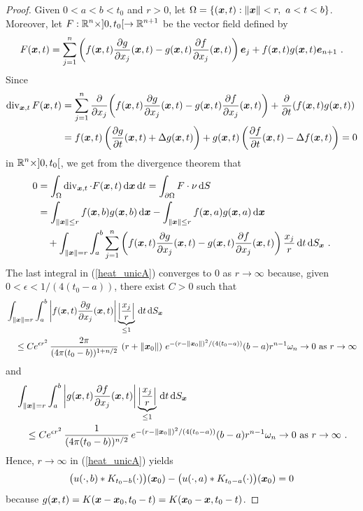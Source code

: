 \begin{proof}
Given $0< a < b < t_0$ and $r>0$, let
$\DS \Omega =
\left\{ (\VEC{x},t) : \|\VEC{x}\| < r, \ a<t<b \right\}$.
Moreover, let $\DS F:\RR^n \times ]0,t_0[ \to \RR^{n+1}$ be
the vector field defined by
\[
F(\VEC{x},t) = \sum_{j=1}^n
\left( f(\VEC{x},t) \pdydx{g}{x_j}(\VEC{x},t) - g(\VEC{x},t)
\pdydx{f}{x_j}(\VEC{x},t) \right) \VEC{e}_j
+ f(\VEC{x},t)g(\VEC{x},t) \VEC{e}_{n+1} \ .
\]
Since
\begin{align*}
\diV_{\VEC{x},t} F(\VEC{x},t)
&= \sum_{j=1}^n \pdfdx{
\left( f(\VEC{x},t) \pdydx{g}{x_j}(\VEC{x},t) - g(\VEC{x},t)
\pdydx{f}{x_j}(\VEC{x},t) \right) }{x_j}
+ \pdfdx{ \left(f(\VEC{x},t)g(\VEC{x},t)\right) }{t} \\
&= 
f(\VEC{x},t) \left( \pdydx{g}{t}(\VEC{x},t) + \Delta g(\VEC{x},t) \right)
+ g(\VEC{x},t) \left( \pdydx{f}{t}(\VEC{x},t) - \Delta f(\VEC{x},t) \right)
= 0
\end{align*}
in $\DS \RR^n \times ]0,t_0[$, we get from the divergence theorem that
\begin{equation} \label{heat_unicA}
\begin{split}
0 &= \int_{\Omega} \diV_{\VEC{x},t}\cdot F(\VEC{x},t) \dx{\VEC{x}}\dx{t} 
= \int_{\partial \Omega} F \cdot \nu \dx{S} \\
&= \int_{\|\VEC{x}\|\leq r} f(\VEC{x},b)g(\VEC{x},b) \dx{\VEC{x}}
- \int_{\|\VEC{x}\|\leq r} f(\VEC{x},a)g(\VEC{x},a) \dx{\VEC{x}} \\
&\quad + \int_{\|\VEC{x}\|=r} \int_a^b
\sum_{j=1}^n \left( f(\VEC{x},t) \pdydx{g}{x_j}(\VEC{x},t) - g(\VEC{x},t)
\pdydx{f}{x_j}(\VEC{x},t) \right) \frac{x_j}{r} \dx{t}\dx{S_{\VEC{x}}} \ .
\end{split}
\end{equation}
The last integral in (\ref{heat_unicA}) converges to $0$ as
$r\to \infty$ because, given $0 < \epsilon < 1/(4(t_0-a))$, there
exist $C>0$ such that
\begin{align*}
&\int_{\|\VEC{x}\|=r} \int_a^b
\left| f(\VEC{x},t) \pdydx{g}{x_j}(\VEC{x},t) \right|
\underbrace{\left|\frac{x_j}{r}\right|}_{\leq 1} \dx{t}\dx{S_{\VEC{x}}} \\
& \quad
\leq C e^{\epsilon r^2}\, \frac{2\pi}{(4\pi (t_0-b))^{1+n/2}}
\, \left(r+\|\VEC{x}_0\|\right)
\, e^{-(r-\|\VEC{x}_0\|)^2/(4(t_0-a))} (b-a) r^{n-1} \omega_n \to 0 \
\text{as} \ r \to \infty
\end{align*}
and
\begin{align*}
&\int_{\|\VEC{x}\|=r} \int_a^b
\left| g(\VEC{x},t) \pdydx{f}{x_j}(\VEC{x},t) \right|
\underbrace{\left|\frac{x_j}{r}\right|}_{\leq 1} \dx{t}\dx{S_{\VEC{x}}} \\
& \quad
\leq C e^{\epsilon r^2}\, \frac{1}{(4\pi (t_0-b))^{n/2}}
\, e^{-(r-\|\VEC{x}_0\|)^2/(4(t_0-a))} (b-a) r^{n-1} \omega_n \to 0 \
\text{as} \ r \to \infty \ .
\end{align*}
Hence,
$r \to \infty$ in (\ref{heat_unicA}) yields
\begin{equation} \label{heat_unicB}
\big(u(\cdot, b) \ast K_{t_0-b}(\cdot)\big)(\VEC{x}_0)
- \big(u(\cdot, a) \ast K_{t_0-a}(\cdot)\big)(\VEC{x}_0) = 0
\end{equation}
because
$g(\VEC{x},t) = K(\VEC{x}-\VEC{x}_0, t_0-t) = K(\VEC{x}_0-\VEC{x}, t_0-t)$.


\end{proof}
